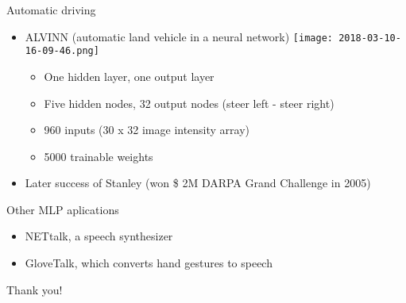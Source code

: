 \documentclass[notes]{beamer}
\newcommand{\chuhao}{\fontsize{44.9pt}{\baselineskip}\selectfont}
\providecommand{\tightlist}{%
  \setlength{\itemsep}{0pt}\setlength{\parskip}{0pt}}
\begin{document}
\begin{frame}{Automatic driving}

\begin{itemize}
\tightlist
\item
  ALVINN (automatic land vehicle in a neural network)
  \texttt{[image: 2018-03-10-16-09-46.png]}

  \begin{itemize}
  \tightlist
  \item
    One hidden layer, one output layer
  \item
    Five hidden nodes, 32 output nodes (steer left - steer right)
  \item
    960 inputs (30 x 32 image intensity array)
  \item
    5000 trainable weights
  \end{itemize}
\item
  Later success of Stanley (won \$ 2M DARPA Grand Challenge in 2005)
\end{itemize}

\end{frame}

\begin{frame}{Other MLP aplications}

\begin{itemize}
\tightlist
\item
  NETtalk, a speech synthesizer
\item
  GloveTalk, which converts hand gestures to speech
\end{itemize}

\end{frame}
\begin{frame}
	\chuhao Thank you! %
\end{frame}
\end{document}
